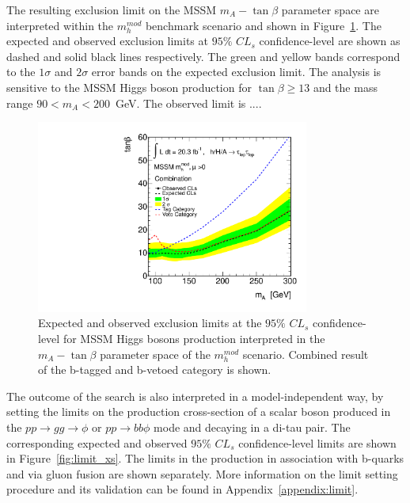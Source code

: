 The resulting exclusion limit on the MSSM $m_A - \tan\beta$ parameter space are interpreted 
within the $m_{h}^{mod}$ benchmark scenario and  shown in Figure~\ref{fig:limit_extract_combined}. 
The expected and observed exclusion limits at $95\%$ $CL_s$  confidence-level 
are shown as dashed and solid black lines respectively. The green 
and yellow bands correspond to the $1\sigma$ and $2\sigma$ error bands on the expected exclusion limit. 
The analysis is sensitive to the MSSM Higgs boson production for $\tan\beta \geq 13$ and the mass range $90<m_A<200$~GeV.
The observed limit is .... %


\begin{figure}[tp]
  \centering
  \includegraphics[width=0.8\textwidth]{figure/limits/comb_mit_thesi.pdf}
  \caption{Expected and observed  exclusion limits at the $95\%$ $CL_s$ confidence-level for MSSM Higgs bosons production 
   interpreted in the  $m_A - \tan\beta$ parameter space of the $m_h^{mod}$ scenario. 
	Combined result of the  b-tagged and b-vetoed category is shown.}
\label{fig:limit_extract_combined}
\end{figure}


The outcome of the search is also interpreted in a model-independent way, by setting the limits
on the production cross-section of a scalar boson produced in the
$pp \rightarrow gg \rightarrow \phi$ or $pp \rightarrow bb\phi$ mode and decaying in a di-tau pair.
The corresponding expected and observed $95\%$ $CL_s$ confidence-level  limits are shown in Figure~\ref{fig:limit_xs}.
The limits in the production in association with b-quarks and via gluon fusion are shown separately.
More information on the limit setting procedure and its validation can be found in Appendix~\ref{appendix:limit}.


